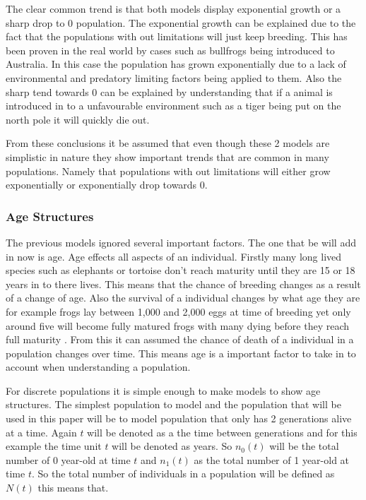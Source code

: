 \documentclass[final]{cmpreport}
\begin{document}
	The clear common trend is that both models display exponential growth or a sharp drop to 0 population. The exponential growth can be explained due to the fact that the populations with out limitations will just keep breeding. This has been proven in the real world by cases such as bullfrogs being introduced to Australia. In this case the population has grown exponentially due to a lack of environmental and predatory limiting factors being applied to them. 
	Also the sharp tend towards 0 can be explained by understanding that if a animal is introduced in to a unfavourable environment such as a tiger being put on the north pole it will quickly die out.
	
	From these conclusions it be assumed that even though these 2 models are simplistic in nature they show important trends that are common in many populations. Namely that populations with out limitations will either grow exponentially or exponentially drop towards 0.
		
	
	\subsubsection{Age Structures}
	
	The previous models ignored several important factors. The one that be will add in now is age. Age effects all aspects of an individual. Firstly many long lived species such as elephants or tortoise don't reach maturity until they are 15 or 18 years in to there lives. This means that the chance of breeding changes as a result of a change of age. Also the survival of a individual changes by what age they are for example frogs lay between 1,000 and 2,000 eggs at time of breeding yet only around five will become fully matured frogs with many dying before they reach full maturity . From this it can assumed the chance of death of a individual in a population changes over time. This means age is a important factor to take in to account when understanding a population.
	
	
	For discrete populations it is simple enough to make models to show age structures. The simplest population to model and the population that will be used in this paper will be to model population that only has 2 generations alive at a time. Again $t$ will be denoted as a the time between generations and for this example the time unit $t$ will be denoted as years. So $n_0(t)$ will be the total number of 0 year-old at time $t$  and $n_1(t)$ as the total number of 1 year-old at time $t$. So the total number of individuals in a population will be defined as $N(t)$ this means that.
	
\end{document}
